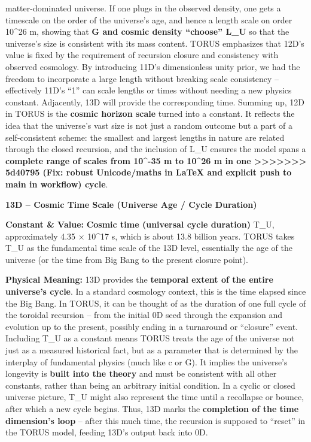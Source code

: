 \documentclass[]{article}
\begin{document}
{matter-dominated universe​. If one plugs in the observed density, one
gets a timescale on the order of the universe's age, and hence a length
scale on order 10\^{}26 m, showing that \textbf{G and cosmic density
``choose'' L\_U} so that the universe's size is consistent with its mass
content. TORUS emphasizes that 12D's value is fixed by the requirement
of recursion closure and consistency with observed cosmology​. By
introducing 11D's dimensionless unity prior, we had the freedom to
incorporate a large length without breaking scale consistency --
effectively 11D's ``1'' can scale lengths or times without needing a new
physics constant​. Adjacently, 13D will provide the corresponding time.
Summing up, 12D in TORUS is the \textbf{cosmic horizon scale} turned
into a constant. It reflects the idea that the universe's vast size is
not just a random outcome but a part of a self-consistent scheme: the
smallest and largest lengths in nature are related through the closed
recursion, and the inclusion of L\_U ensures the model spans a
\textbf{complete range of scales from 10\^{}-35 m to 10\^{}26 m in one
>>>>>>> 5d40795 (Fix: robust Unicode/maths in LaTeX and explicit push to main in workflow)
cycle}.

\textbf{13D -- Cosmic Time Scale (Universe Age / Cycle Duration)}

\textbf{Constant \& Value:} \textbf{Cosmic time (universal cycle
duration)} T\_U, approximately 4.35 × 10\^{}17 s​, which is about 13.8
billion years. TORUS takes T\_U as the fundamental time scale of the 13D
level, essentially the age of the universe (or the time from Big Bang to
the present closure point).

\textbf{Physical Meaning:} 13D provides the \textbf{temporal extent of
the entire universe's cycle}. In a standard cosmology context, this is
the time elapsed since the Big Bang. In TORUS, it can be thought of as
the duration of one full cycle of the toroidal recursion -- from the
initial 0D seed through the expansion and evolution up to the present,
possibly ending in a turnaround or ``closure'' event​. Including T\_U as
a constant means TORUS treats the age of the universe not just as a
measured historical fact, but as a parameter that is determined by the
interplay of fundamental physics (much like c or G). It implies the
universe's longevity is \textbf{built into the theory} and must be
consistent with all other constants, rather than being an arbitrary
initial condition​. In a cyclic or closed universe picture, T\_U might
also represent the time until a recollapse or bounce, after which a new
cycle begins. Thus, 13D marks the \textbf{completion of the time
dimension's loop} -- after this much time, the recursion is supposed to
``reset'' in the TORUS model, feeding 13D's output back into 0D.

}
\end{document}
